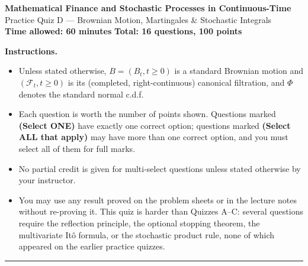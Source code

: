 \documentclass[11pt]{article}
\begin{document}
\begin{center}
{\LARGE\bfseries Mathematical Finance and Stochastic Processes in Continuous-Time}\\[4pt]
{\Large Practice Quiz D --- Brownian Motion, Martingales \& Stochastic Integrals}\\[8pt]
\textbf{Time allowed: 60 minutes} \qquad \textbf{Total: 16 questions, 100 points}
\end{center}

\vspace{4pt}
\noindent\textbf{Instructions.}
\begin{itemize}[nosep,leftmargin=*]
  \item Unless stated otherwise, $B=(B_t,t\ge0)$ is a standard Brownian motion and $(\mathcal F_t,t\ge0)$ is its (completed, right-continuous) canonical filtration, and $\Phi$ denotes the standard normal c.d.f.
  \item Each question is worth the number of points shown. Questions marked \textbf{(Select ONE)} have exactly one correct option; questions marked \textbf{(Select ALL that apply)} may have more than one correct option, and you must select all of them for full marks.
  \item No partial credit is given for multi-select questions unless stated otherwise by your instructor.
  \item You may use any result proved on the problem sheets or in the lecture notes without re-proving it. This quiz is harder than Quizzes A--C: several questions require the reflection principle, the optional stopping theorem, the multivariate It\^o formula, or the stochastic product rule, none of which appeared on the earlier practice quizzes.
\end{itemize}

\vspace{10pt}
\hrule
\vspace{10pt}
\end{document}
